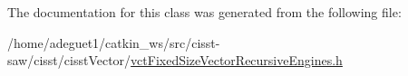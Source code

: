 The documentation for this class was generated from the following file\-:\begin{DoxyCompactItemize}
\item 
/home/adeguet1/catkin\-\_\-ws/src/cisst-\/saw/cisst/cisst\-Vector/\hyperlink{vct_fixed_size_vector_recursive_engines_8h}{vct\-Fixed\-Size\-Vector\-Recursive\-Engines.\-h}\end{DoxyCompactItemize}

